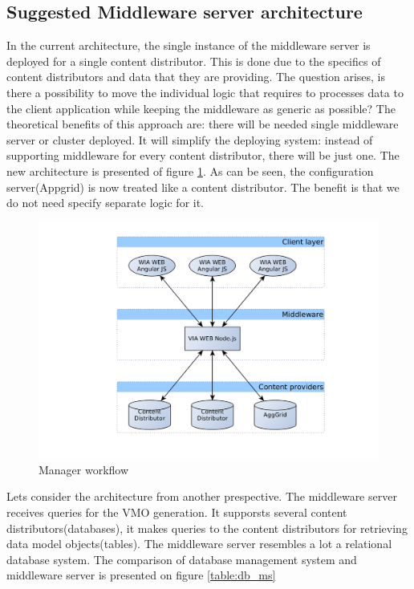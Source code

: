 \subsection{Suggested Middleware server architecture}

In the current architecture, the single instance of the middleware server is deployed for a single content distributor. This is done due to the specifics of content distributors and data that they are providing. The question arises, is there a possibility to move the individual logic that requires to processes data to the client application while keeping the middleware as generic as possible? The theoretical benefits of this approach are: there will be needed single middleware server or cluster deployed. It will simplify the deploying system: instead of supporting middleware for every content distributor, there will be just one. The new architecture is presented of figure \ref{fig:arch_overview_new}. As can be seen, the configuration server(Appgrid) is now treated like a content distributor. The benefit is that we do not need specify separate logic for it. 

\begin{figure}[h]
    \centering
	\includegraphics[width=\textwidth]{images/thesis_global_architecture_new.png}
    \caption{Manager workflow}
    \label{fig:arch_overview_new}
\end{figure}

Lets consider the architecture from another prespective.
The middleware server receives queries for the VMO generation. It supporsts several content distributors(databases), it makes queries to the content distributors for retrieving data model objects(tables). The middleware server resembles a lot a relational database system. The comparison of database management system and middleware server is presented on figure \ref{table:db_ms}

